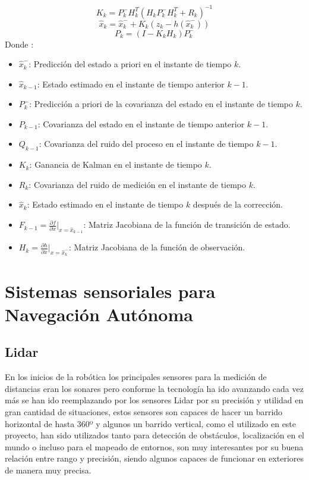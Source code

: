 \begin{equation}\label{eq:ganancia_kalman}
K_k = P_k^-H_k^T(H_kP_k^-H_k^T + R_k)^{-1}
\end{equation}
\begin{equation}\label{eq:actualizacion_estado}
\hat{x}_k = \hat{x}_k^- + K_k(z_k - h(\hat{x}_k^-))
\end{equation}
\begin{equation}\label{eq:actualizacion_covarianza}
P_k = (I - K_kH_k)P_k^-
\end{equation}
Donde :

\begin{itemize}
    \item \( \hat{x}_k^- \): Predicción del estado a priori en el instante de tiempo \( k \).
    \item \( \hat{x}_{k-1} \): Estado estimado en el instante de tiempo anterior \( k-1 \).
    \item \( P_k^- \): Predicción a priori de la covarianza del estado en el instante de tiempo \( k \).
    \item \( P_{k-1} \): Covarianza del estado en el instante de tiempo anterior \( k-1 \).
    \item \( Q_{k-1} \): Covarianza del ruido del proceso en el instante de tiempo \( k-1 \).
    \item \( K_k \): Ganancia de Kalman en el instante de tiempo \( k \).
    \item \( R_k \): Covarianza del ruido de medición en el instante de tiempo \( k \).
    \item \( \hat{x}_k \): Estado estimado en el instante de tiempo \( k \) después de la corrección.
    \item \( F_{k-1} = \frac{\partial f}{\partial x}\Bigg|_{x=\hat{x}_{k-1}} \): Matriz Jacobiana de la función de transición de estado.
    \item \( H_k = \frac{\partial h}{\partial x}\Bigg|_{x=\hat{x}_k^-} \): Matriz Jacobiana de la función de observación.
\end{itemize}



\section{Sistemas sensoriales para Navegación Autónoma}
\subsection{Lidar}
En los inicios de la robótica los principales sensores para la medición de distancias eran los sonares pero conforme la tecnología ha ido avanzando 
cada vez más se han ido reemplazando por los sensores Lidar por su precisión y utilidad en gran cantidad de situaciones, 
estos sensores son capaces de hacer un barrido horizontal de hasta 360º y algunos un barrido vertical, como el utilizado en este proyecto, 
han sido utilizados tanto para detección de obstáculos, localización en el mundo o incluso para el mapeado de entornos, son muy interesantes 
por su buena relación entre rango y precisión, siendo algunos capaces de funcionar en exteriores de manera muy precisa.

